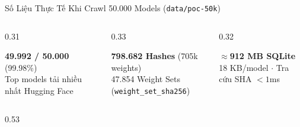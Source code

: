 \documentclass[aspectratio=169, xcolor=table]{beamer}
\begin{document}
\begin{frame}{Số Liệu Thực Tế Khi Crawl 50.000 Models (\texttt{data/poc-50k})}
    \vspace{-0.15cm}
    \begin{columns}[onlytextwidth]
        \begin{column}{0.31\textwidth}
            \begin{infobox}
                \scriptsize \textbf{49.992 / 50.000} (99.98\%)\\[2pt]
                \tiny Top models tải nhiều nhất Hugging Face
            \end{infobox}
        \end{column}
        \hfill
        \begin{column}{0.33\textwidth}
            \begin{infobox}
                \scriptsize \textbf{798.682 Hashes} (705k weights)\\[2pt]
                \tiny 47.854 Weight Sets (\texttt{weight\_set\_sha256})
            \end{infobox}
        \end{column}
        \hfill
        \begin{column}{0.32\textwidth}
            \begin{successbox}
                \scriptsize \textbf{$\approx$912 MB SQLite}\\[2pt]
                \tiny 18 KB/model $\cdot$ Tra cứu SHA $<1$ms
            \end{successbox}
        \end{column}
    \end{columns}
    \vspace{0.12cm}
    \begin{columns}[onlytextwidth, T]
        \begin{column}{0.53\textwidth}
            \centering
\end{column}
\end{columns}
\end{frame}
\end{document}
